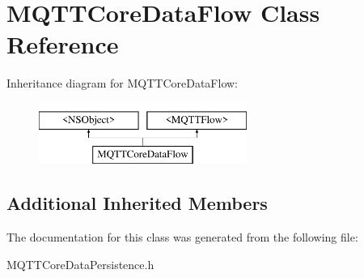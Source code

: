 \hypertarget{interface_m_q_t_t_core_data_flow}{}\section{M\+Q\+T\+T\+Core\+Data\+Flow Class Reference}
\label{interface_m_q_t_t_core_data_flow}
Inheritance diagram for M\+Q\+T\+T\+Core\+Data\+Flow\+:\begin{figure}[H]
\begin{center}
\leavevmode
\includegraphics[height=2.000000cm]{interface_m_q_t_t_core_data_flow}
\end{center}
\end{figure}
\subsection*{Additional Inherited Members}


The documentation for this class was generated from the following file\+:\begin{DoxyCompactItemize}
\item 
M\+Q\+T\+T\+Core\+Data\+Persistence.\+h\end{DoxyCompactItemize}
